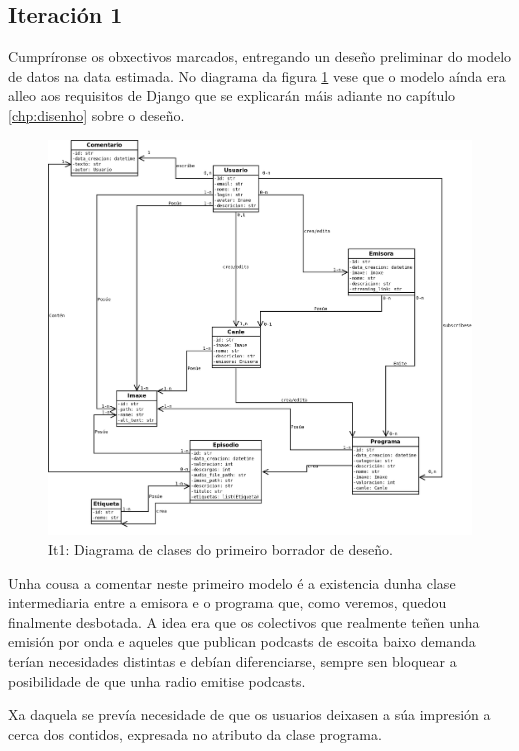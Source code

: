 \subsection{Iteración 1}

Cumpríronse os obxectivos marcados, entregando un deseño preliminar do modelo de datos na data estimada. No diagrama da figura \ref{fig:classold} vese que o modelo aínda era alleo aos requisitos de Django que se explicarán máis adiante no capítulo \ref{chp:disenho} sobre o deseño.

\begin{figure}[h]
	\centering
	\includegraphics[scale=0.35,keepaspectratio=true]{./images/class_diagram_20171107.png}
	\caption{It1: Diagrama de clases do primeiro borrador de deseño.}
	\label{fig:classold}
\end{figure}

Unha cousa a comentar neste primeiro modelo é a existencia dunha clase  intermediaria entre a emisora e o programa que, como veremos, quedou finalmente desbotada. A idea era que os colectivos que realmente teñen unha emisión por onda e aqueles que publican podcasts de escoita baixo demanda terían necesidades distintas e debían diferenciarse, sempre sen bloquear a posibilidade de que unha radio emitise podcasts.

Xa daquela se prevía necesidade de que os usuarios deixasen a súa impresión a cerca dos contidos, expresada no atributo  da clase programa. 

